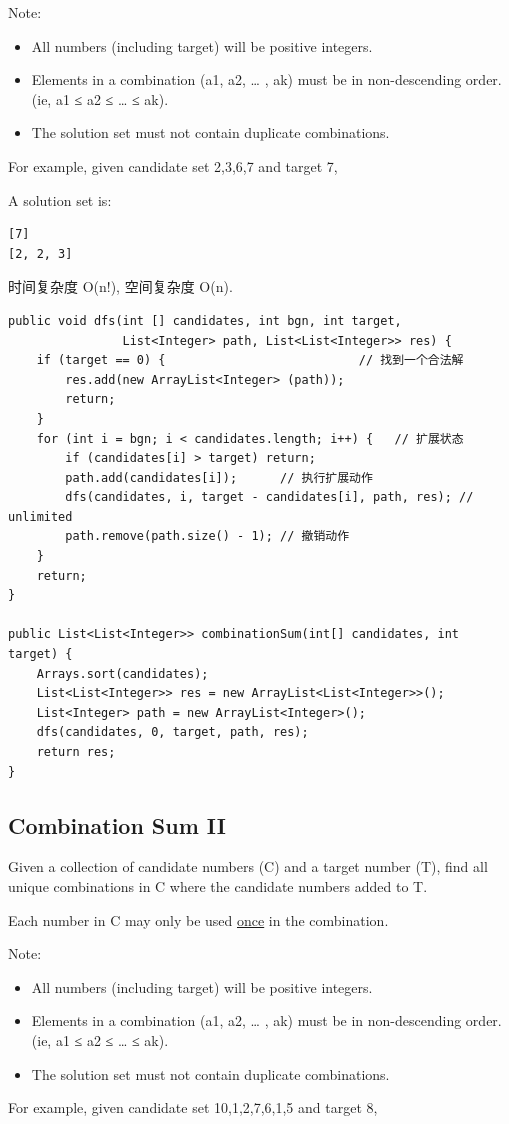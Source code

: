 \documentclass[12pt]{book}
\begin{document}
Note:
\begin{itemize}
\item All numbers (including target) will be positive integers.
\item Elements in a combination (a1, a2, … , ak) must be in non-descending order. (ie, a1 ≤ a2 ≤ … ≤ ak).
\item The solution set must not contain duplicate combinations.
\end{itemize}

For example, given candidate set 2,3,6,7 and target 7, 

A solution set is: 
\lstset{language=java,label= ,caption= ,numbers=none}
\begin{lstlisting}
[7] 
[2, 2, 3]
\end{lstlisting}

时间复杂度 O(n!), 空间复杂度 O(n). 

\lstset{language=java,label= ,caption= ,numbers=none}
\begin{lstlisting}
public void dfs(int [] candidates, int bgn, int target,
                List<Integer> path, List<List<Integer>> res) {
    if (target == 0) {                           // 找到一个合法解
        res.add(new ArrayList<Integer> (path));
        return;
    }
    for (int i = bgn; i < candidates.length; i++) {   // 扩展状态
        if (candidates[i] > target) return;
        path.add(candidates[i]);      // 执行扩展动作
        dfs(candidates, i, target - candidates[i], path, res); // unlimited
        path.remove(path.size() - 1); // 撤销动作
    }
    return;
}

public List<List<Integer>> combinationSum(int[] candidates, int target) {
    Arrays.sort(candidates); 
    List<List<Integer>> res = new ArrayList<List<Integer>>();
    List<Integer> path = new ArrayList<Integer>();
    dfs(candidates, 0, target, path, res);
    return res;
}
\end{lstlisting}

\subsection{Combination Sum II}
\label{sec-11-1-5}
Given a collection of candidate numbers (C) and a target number (T), find all unique combinations in C where the candidate numbers added to T.

Each number in C may only be used \uline{once} in the combination.

Note:
\begin{itemize}
\item All numbers (including target) will be positive integers.
\item Elements in a combination (a1, a2, … , ak) must be in non-descending order. (ie, a1 ≤ a2 ≤ … ≤ ak).
\item The solution set must not contain duplicate combinations.
\end{itemize}
For example, given candidate set 10,1,2,7,6,1,5 and target 8, 
\end{document}
